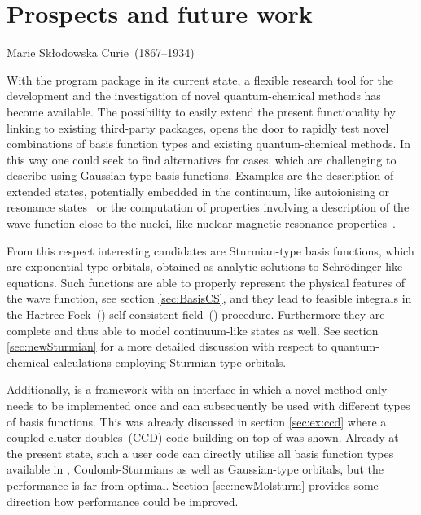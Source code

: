 \chapter{Prospects and future work}
\label{ch:Prospects}
{Marie Skłodowska Curie~(1867--1934)}

\noindent
With the \molsturm program package in its
current state, a flexible research tool
for the development and the investigation of novel quantum-chemical methods
has become available.
The possibility to easily extend the present functionality
by linking to existing third-party packages,
opens the door to rapidly test novel combinations of basis function types
and existing quantum-chemical methods.
In this way one could seek to find alternatives for cases,
which are challenging to describe using Gaussian-type basis functions.
Examples are the description of extended states,
potentially embedded in the continuum,
like autoionising or resonance states~\cite{Feshbach1958,Feshbach1962,Riss1993,Santra2002}
or the computation of properties involving a description
of the wave function close to the nuclei,
like nuclear magnetic resonance properties~\cite{Guell2008,Hoggan2009}.

From this respect interesting candidates are Sturmian-type basis functions,
which are exponential-type orbitals,
obtained as analytic solutions to Schrödinger-like equations.
Such functions are able to properly represent
the physical features of the wave function,
see section \ref{sec:BasisCS},
and they lead to feasible integrals
in the Hartree-Fock~(\HF) self-consistent field~(\SCF) procedure.
Furthermore they are complete
and thus able to model continuum-like states as well.
See section \ref{sec:newSturmian} for a more
detailed discussion with respect to
quantum-chemical calculations employing Sturmian-type orbitals.

Additionally, \molsturm is a framework with an interface
in which a novel method only needs to be implemented
once and can subsequently be
used with different types of basis functions.
This was already discussed in section \ref{sec:ex:ccd}
where a coupled-cluster doubles~(CCD) code building on top of \molsturm was shown.
Already at the present state, such a user code can
directly utilise all basis function types available in \molsturm,
\ie Coulomb-Sturmians as well as Gaussian-type orbitals,
but the performance is far from optimal.
Section \ref{sec:newMolsturm} provides some direction
how performance could be improved.

